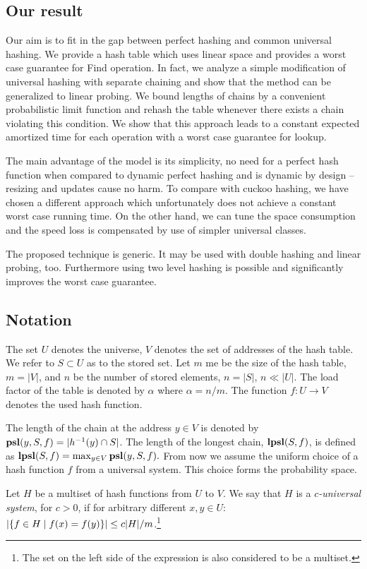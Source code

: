\subsection{Our result}
Our aim is to fit in the gap between perfect hashing and common universal hashing.
We provide a hash table which uses linear space and provides a worst case guarantee for Find operation.
In fact, we analyze a simple modification of universal hashing with separate chaining and show that the method can be generalized to linear probing.
We bound lengths of chains by a convenient probabilistic limit function and rehash the table whenever there exists a chain violating this condition.
We show that this approach leads to a constant expected amortized time for each operation with a worst case guarantee for lookup.

The main advantage of the model is its simplicity, no need for a perfect hash function when compared to dynamic perfect hashing and is dynamic by design -- resizing and updates cause no harm.
To compare with cuckoo hashing, we have chosen a different approach which unfortunately does not achieve a constant worst case running time.
On the other hand, we can tune the space consumption and the speed loss is compensated by use of simpler universal classes.

The proposed technique is generic. It may be used with double hashing and linear probing, too. 
Furthermore using two level hashing is possible and significantly improves the worst case guarantee.

\subsection{Notation}
The set $U$ denotes the universe, $V$ denotes the set of addresses of the hash table.
We refer to $S \subset U$ as to the stored set.
Let $m$ me be the size of the hash table, $m = |V|$, and $n$ be the number of stored elements, $n = |S|$, $n \ll |U|$. 
The load factor of the table is denoted by $\alpha$ where $\alpha = {n}/{m}$.
The function $f\colon U \rightarrow V$ denotes the used hash function. 

The length of the chain at the address $y \in V$ is denoted by $\mathbf{psl}(y, S, f) = |h^{-1}(y) \cap S|$. 
The length of the longest chain, $\mathbf{lpsl}(S, f)$, is defined as $\mathbf{lpsl}(S, f) = \max_{y \in V} \mathbf{psl}(y, S, f).$
From now we assume the uniform choice of a hash function $f$ from a universal system. 
This choice forms the probability space.

\begin{definition}
\label{definition-c-universal-system}
Let $H$ be a multiset of hash functions from $U$ to $V$. We say that $H$ is a \emph{$c$-universal system}, for $c > 0$, if for arbitrary different $x, y \in U$: $\left|\lbrace f \in H \mid f(x) = f(y) \rbrace\right| \leq {c|H|}/{m}$.\footnote{The set on the left side of the expression is also considered to be a multiset.}
\end{definition}

